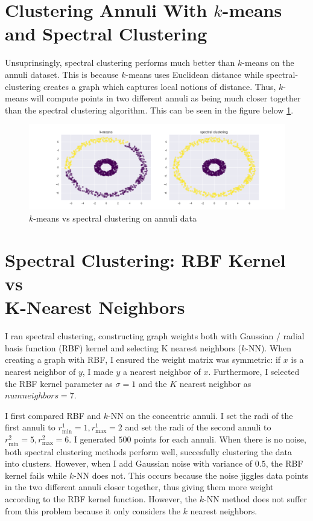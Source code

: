 \documentclass{article}
\begin{document}
\section[short]{Clustering Annuli With $k$-means and Spectral Clustering}

    Unsuprinsingly, spectral clustering performs much better than $k$-means on the annuli dataset. This is because $k$-means uses Euclidean distance while spectral-clustering creates a graph which captures local notions of distance. Thus, $k$-means will compute points in two different annuli as being much closer together than the spectral clustering algorithm. This can be seen in the figure below \ref{fig:annuli}.

    \begin{figure}[ht]
        \label{fig:annuli}
        \includegraphics[width=0.90\linewidth]{images/q6/k-means_vs_spectral_clustering.png}
        \caption{$k$-means vs spectral clustering on annuli data}
    \end{figure}
    \pagebreak

\section[short]{Spectral Clustering: RBF Kernel vs \\ K-Nearest Neighbors}

    I ran spectral clustering, constructing graph weights both with Gaussian / radial basis function (RBF) kernel and selecting K nearest neighbors ($k$-NN). When creating a graph with RBF, I ensured the weight matrix was symmetric: if $x$ is a nearest neighbor of $y$, I made $y$ a nearest neighbor of $x$. Furthermore, I selected the RBF kernel parameter as $\sigma = 1$ and the $K$ nearest neighbor as $num neighbors = 7$. 

    I first compared RBF and $k$-NN on the concentric annuli. I set the radi of the first annuli to $r_{\textrm{min}}^1 = 1, r_{\textrm{max}}^1 = 2$ and set the radi of the second annuli to $r_{\textrm{min}}^2 = 5, r_{\textrm{max}}^2 = 6$. I generated $500$ points for each annuli. When there is no noise, both spectral clustering methods perform well, succesfully clustering the data into clusters. However, when I add Gaussian noise with variance of $0.5$, the RBF kernel fails while $k$-NN does not. This occurs because the noise jiggles data points in the two different annuli closer together, thus giving them more weight according to the RBF kernel function. However, the $k$-NN method does not suffer from this problem because it only considers the $k$ nearest neighbors.
\end{document}
